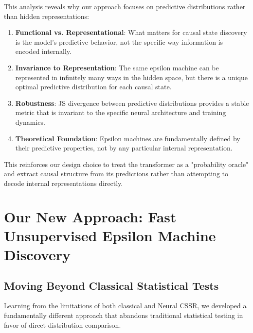 \documentclass[11pt]{article}
\begin{document}
This analysis reveals why our approach focuses on predictive distributions rather than hidden representations:

\begin{enumerate}
    \item \textbf{Functional vs. Representational}: What matters for causal state discovery is the model's predictive behavior, not the specific way information is encoded internally.

    \item \textbf{Invariance to Representation}: The same epsilon machine can be represented in infinitely many ways in the hidden space, but there is a unique optimal predictive distribution for each causal state.

    \item \textbf{Robustness}: JS divergence between predictive distributions provides a stable metric that is invariant to the specific neural architecture and training dynamics.

    \item \textbf{Theoretical Foundation}: Epsilon machines are fundamentally defined by their predictive properties, not by any particular internal representation.
\end{enumerate}

This reinforces our design choice to treat the transformer as a "probability oracle" and extract causal structure from its predictions rather than attempting to decode internal representations directly.

\section{Our New Approach: Fast Unsupervised Epsilon Machine Discovery}

\subsection{Moving Beyond Classical Statistical Tests}

Learning from the limitations of both classical and Neural CSSR, we developed a fundamentally different approach that abandons traditional statistical testing in favor of direct distribution comparison.
\end{document}
